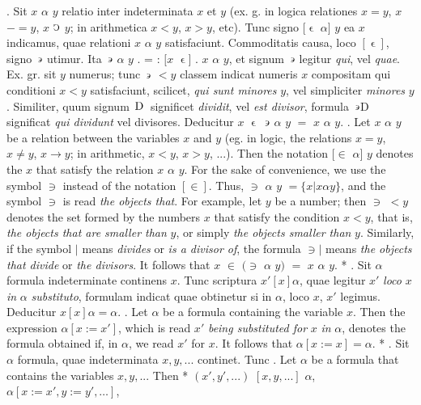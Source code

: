 \documentclass{book}
\newcommand{\C}{\mathop{\sbox0{$\displaystyle$$\reflectbox{C}$} %
\raisebox{-\height+\ht0-0.05cm}[\ht0][\dp0]{\scalebox{0.8}[0.8]{\copy0}}}\displaylimits} %
\newcommand{\such}{\thinspace \rotatebox[origin=c]{180}{$\epsilon$}}
\newcommand{\smallIn}{\ensuremath{\mathrel{\epsilon}}}
\newcommand{\D}{\mathop{\thinspace \text{D} \thinspace}}
\newenvironment{translateTwoCol}
               { %
                 \columnratio{0.5, 0.5} \begin{paracol}{2}
                 \newcommand{\LAT}{\switchcolumn[0]*}
                 \newcommand{\ENG}{\switchcolumn[1]}
               }
               { %
                 \let\ENG\undefined
                 \let\LAT\undefined
                 \end{paracol}
               }
\begin{document}
\begin{translateTwoCol}
. Sit $x$ $\alpha$ $y$ relatio inter indeterminata $x$ et $y$ (ex. g. in logica relationes $x = y$, $x$ $- = y$, $x$ $\C$ $y$; in arithmetica $x < y$, $x > y$, etc). Tunc signo $[\smallIn$ $\alpha]$ $y$ ea $x$ indicamus, quae relationi $x$ $\alpha$ $y$ satisfaciunt. Commoditatis causa, loco $[\smallIn]$, signo $\such$ utimur. Ita $\such$ $\alpha$ $y$ . = : $[x$ $\smallIn ]$ . $x$ $\alpha$ $y$, et signum $\such$ legitur \emph{qui}, vel \emph{quae}. Ex. gr. sit $y$ numerus; tunc $\such$ $< y$ classem indicat numeris $x$ compositam qui conditioni $x<y$ satisfaciunt, scilicet, \emph{qui sunt minores} $y$, vel simpliciter \emph{minores} $y$. Similiter, quum signum $\D$ significet \emph{dividit}, vel \emph{est divisor}, formula $\such$D significat \emph{qui dividunt} vel {divisores}. Deducitur $x$ $\smallIn$ $\such$ $\alpha$ $y$ $=$ $x$ $\alpha$ $y$.
\ENG
{}. Let $x$ $\alpha$ $y$ be a relation between the variables $x$ and $y$ (eg. in logic, the relations $x = y$, $x \not= y$, $x \rightarrow y$; in arithmetic, $x < y$, $x > y$, ...). Then the notation $[\in$ $\alpha]$ $y$ denotes the $x$ that satisfy the relation $x$ $\alpha$ $y$. For the sake of convenience, we use the symbol $\ni$ instead of the notation $[\in]$. Thus, $\ni$ $\alpha$ $y$  $= \{ x | x \alpha y \}$, and the symbol $\ni$ is read \emph{the objects that}. For example, let $y$ be a number; then $\ni$ $< y$ denotes the set formed by the numbers $x$ that satisfy the condition $x<y$, that is, \emph{the objects that are smaller than} $y$, or simply \emph{the objects smaller than} $y$. Similarly, if the symbol $|$ means \emph{divides} or \emph{is a divisor of}, the formula $\ni|$ means \emph{the objects that divide} or \emph{the divisors}. It follows that $x$ $\in$ $(\ni$ $\alpha$ $y)$ $=$ $x$ $\alpha$ $y$.   %
\LAT
{}. Sit $\alpha$ formula indeterminate continens $x$. Tunc scriptura $x' [x] \alpha$, quae legitur $x'$ \emph{loco} $x$ \emph{in} $\alpha$ \emph{substituto}, formulam indicat quae obtinetur si in $\alpha$, loco $x$, $x'$ legimus. Deducitur $x [x] \alpha = \alpha$.
\ENG
{}. Let $\alpha$ be a formula containing the variable $x$. Then the expression $\alpha [ x := x' ]$, which is read $x'$ \emph{being substituted for} $x$ \emph{in} $\alpha$, denotes the formula obtained if, in $\alpha$, we read $x'$ for $x$. It follows that $\alpha[x := x] = \alpha$.
\LAT
{}. Sit $\alpha$ formula, quae indeterminata $x,y,...$ continet. Tunc
\ENG
{}. Let $\alpha$ be a formula that contains the variables $x,y,...$ Then
\LAT
\hspace{1.06cm} $(x',y',...)$ $[x,y,...]$ $\alpha$,
\ENG
\hspace{1.06cm} $\alpha[x:=x', y:=y', \ldots]$,
\end{translateTwoCol}
\end{document}
